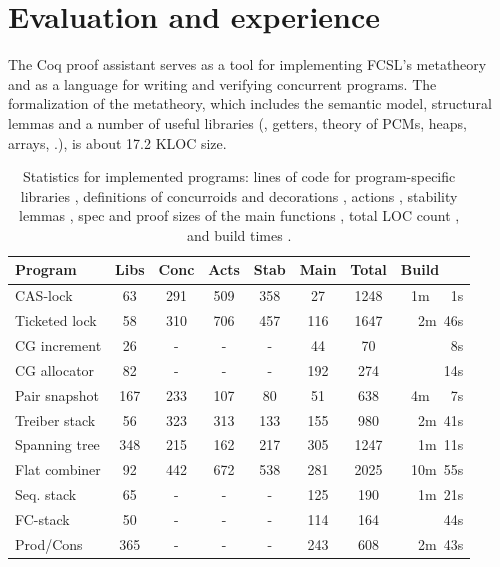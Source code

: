
\section{Evaluation and experience}
\label{sec:eval-exper}

The Coq proof assistant serves as a tool for implementing FCSL's
metatheory and as a language for writing and verifying concurrent
programs.
%
The formalization of the metatheory, which includes the semantic
model, structural lemmas and a number of useful libraries (\eg,
getters, theory of PCMs, heaps, arrays, \etc.), is about 17.2 KLOC
size.

{
\setlength{\belowcaptionskip}{-10pt} 
\begin{table}
{%
\sffamily\small %
\centering
\begin{tabular}{|@{\ }l@{\ }||@{\ }c@{\ }|@{\ }c@{\ }|@{\ }c@{\ }|@{\ }c@{\ }|@{\ }c@{\ }|@{\ }c@{\ }||@{\ }r@{\ }|}
  \hline
  \textbf{Program} &  
  {Libs} & {Conc} & {Acts} &
  {Stab} & {Main} & \textbf{Total}
  & \textbf{Build~~~}   
  \\ \hline \hline 
  CAS-lock & 63 & 291 & 509 & 358 & 27 & 1248 & 1m~~~1s
  \\
  Ticketed lock & 58 & 310 & 706 & 457 & 116 & 1647 & 2m~46s
  \\
  CG increment & 26 & - & - & - & 44 & 70 & 8s
  \\
  CG allocator & 82 & - & - & - & 192 & 274 & 14s
  \\
  Pair snapshot & 167 & 233 & 107 & 80 & 51 & 638 & 4m~~~7s 
  \\
  Treiber stack & 56 & 323 & 313 & 133  & 155 & 980 & 2m~41s
  \\
  Spanning tree & 348 & 215 & 162 & 217 & 305 & 1247 & 1m~11s
  \\
  Flat combiner & 92 & 442 & 672 & 538 & 281 & 2025 &  10m~55s
  \\ 
  Seq. stack & 65 & - & - & - & 125 & 190 & 1m~21s
  \\
  FC-stack & 50 & - & - & - & 114 & 164 & 44s
  \\
  Prod/Cons & 365 & - & - & - & 243 & 608 & 2m~43s
  \\[2pt] \hline
\end{tabular}
\vspace{-5pt}
\caption{
  Statistics for implemented programs: lines of code for program-specific libraries ,
  definitions of concurroids and decorations , actions ,
  stability lemmas , spec and proof sizes of the main
  functions , total LOC count , and build
  times .
} 
\label{tab:locs}
}
\end{table}}
